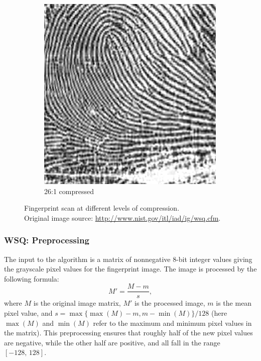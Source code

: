 \begin{figure}[H]
\begin{subfigure}{.32\textwidth}
  \includegraphics[width=.7\linewidth]{figures/compressed_finger(60comp).png}
  \caption{26:1 compressed}
  \label{fig:sub2}
\end{subfigure}
\caption{Fingerprint scan at different levels of compression.\\
Original image source: \url{http://www.nist.gov/itl/iad/ig/wsq.cfm}.
}
\label{fig:finger_compression}
\end{figure}

\subsubsection*{WSQ: Preprocessing}
The input to the algorithm is a matrix of nonnegative 8-bit integer values giving the grayscale pixel values for the fingerprint image.
The image is processed by the following formula:
\[
M' = \frac{M-m}{s},
\]
where $M$ is the original image matrix, $M'$ is the processed image, $m$ is the mean pixel value, and $s = \max\{\max(M) - m, m - \min(M)\}/128$
(here $\max(M)$ and $\min(M)$ refer to the maximum and minimum pixel values in the matrix).
This preprocessing ensures that roughly half of the new pixel values are negative, while the other half are positive, and all fall in the range $[-128,\,128]$.

